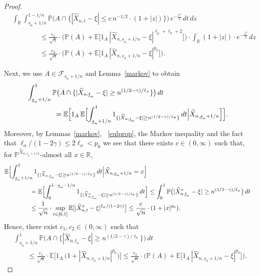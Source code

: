 \documentclass[11pt]{amsart}
\newcommand{\R}{{\mathbb R}}
\newcommand{\EE}{{\mathbb E}}
\newcommand{\PP}{{\mathbb P}}
\newcommand{\eul}{{\widehat X}}
\newcommand{\ind}{1}
\newcommand{\usn}{\underline {s}_n}
\newcommand{\utn}{\underline {t}_n}
\newcommand{\F}{{\mathcal F}}
\theoremstyle{plain}
\theoremstyle{definition}
\begin{document}
\begin{proof}
\begin{equation}\label{key04a}
\begin{aligned}
& \int_{\R} \int_{\usn+1/n}^{1-1/n} \PP\bigl(A \cap \bigl\{|\widehat X_{n,t}-\xi| \le c\, n^{-1/2}\cdot (1+|z|)\bigr\}\bigr)\, e^{-\frac{z^2}{2}}\, dt\, dz\\
& \qquad \qquad \le \frac{c_1}{\sqrt n}\cdot \bigl(\PP(A) + \EE\bigl[\ind_{A}\, |\eul_{n,\usn+1/n}-\xi|^{\ell_\mu + \ell_\sigma+2}\bigr]\bigr) \cdot\int_{\R} (1+|z|)\cdot e^{-\frac{z^2}{2}}\,  dz\\
 & \qquad \qquad \le \frac{c_2}{\sqrt n}\cdot\bigl(\PP(A) + \EE\bigl[\ind_{A}\, |\eul_{n,\usn+1/n}-\xi|^{p_0}\bigr]\bigr).
\end{aligned}
\end{equation}

Next, we use $A\in \F_{\usn+1/n}$ and
Lemma~\ref{markov} to obtain
\begin{equation}\label{key04b}
\begin{aligned}
&\int_{\usn+1/n}^1  \PP\bigl(A\cap\{|\widehat X_{n,\utn}-\xi|\geq n^{(1/2-\gamma)/\ell_\sigma}\}\bigr)\, dt\\
&\qquad\qquad = \EE\Bigl[\ind_{A}\, \EE\Bigl[\int_{\usn+1/n}^{1} \ind_{\{|\widehat X_{n,\utn}-\xi|\geq n^{(1/2-\gamma)/\ell_\sigma}\}}\, dt\Bigl|\eul_{n,\usn+1/n}\Bigr]\Bigr].
\end{aligned}
\end{equation}
Moreover,
by  Lemmas~\ref{markov}, ~\ref{eulprop},
the Markov inequality
 and the fact that $\ell_\sigma/(1-2\gamma)\leq 2\ell_\sigma< p_0$
 we see that there exists $c\in(0, \infty)$ such that,  for  $\PP ^{\eul_{n,\usn+1/n}} $-almost all
$x\in\R$,
\begin{align*}
& \EE\Bigl[\int_{\usn+1/n}^{1} \ind_{\{|\widehat X_{n,\utn}-\xi|\geq n^{(1/2-\gamma)/\ell_\sigma}\}}\, dt\Bigl|\eul_{n,\usn+1/n}= x\Bigr] \\
& \qquad\qquad  =  \EE\Bigl[\int_{0}^{1-\usn-1/n}  \ind_{\{|\widehat X^x_{n,\utn}-\xi|\geq n^{(1/2-\gamma)/\ell_\sigma}\}}\, dt\Bigr]\le \int_0^1 \PP\bigl( |\widehat X^x_{n,\utn}-\xi|\geq n^{(1/2-\gamma)/\ell_\sigma}\bigr)\, dt\\
& \qquad\qquad  \leq \frac{1}{\sqrt n}\cdot \sup_{t\in[0,1]}  \EE[|\widehat X^x_{n,t}-\xi|^{\ell_\sigma/(1-2\gamma)}\bigr] \le \frac{c}{\sqrt n}\cdot  (1+|x|^{p_0}).
\end{align*}
Hence, there exist $c_1, c_2\in(0, \infty)$ such that
\begin{equation}\label{key04c}
\begin{aligned}
&\int_{\usn+1/n}^1  \PP\bigl(A\cap\{|\widehat X_{n,\utn}-\xi|\geq n^{(1/2-\gamma)/\ell_\sigma}\}\bigr)\, dt\\
&\qquad  \le \frac{c_1}{\sqrt n}\cdot \EE\bigl[1_A \, \bigl(1+ |\eul_{n,\usn+1/n}|^{p_0}\bigr)\bigr] \le \frac{c_2}{\sqrt n}\cdot \bigl(\PP(A) + \EE\bigl[1_A \,  |\eul_{n,\usn+1/n}-\xi|^{p_0}\bigr]\bigr).
\end{aligned}
\end{equation}


\end{proof}
\end{document}
